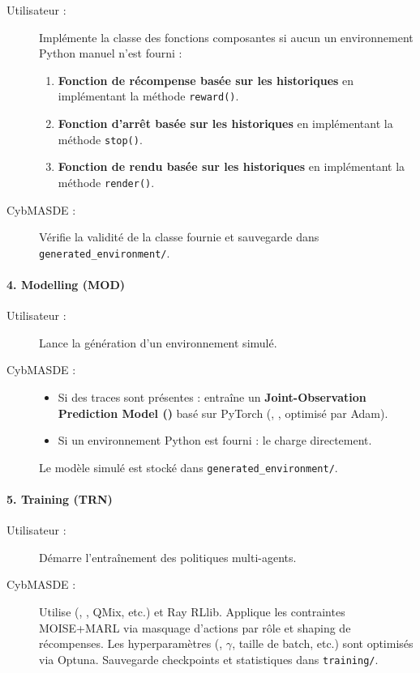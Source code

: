 \begin{description}
  \item[Utilisateur :] Implémente la classe des fonctions composantes si aucun un environnement Python manuel n’est fourni :
    \begin{enumerate}
      \item \textbf{Fonction de récompense basée sur les historiques} en implémentant la méthode \texttt{reward()}.
      \item \textbf{Fonction d'arrêt basée sur les historiques} en implémentant la méthode \texttt{stop()}.
      \item \textbf{Fonction de rendu basée sur les historiques} en implémentant la méthode \texttt{render()}.
    \end{enumerate}
  \item[CybMASDE :] Vérifie la validité de la classe fournie et sauvegarde dans \texttt{generated\_environment/}.
\end{description}

\paragraph{4. Modelling (MOD)}
\begin{description}
  \item[Utilisateur :] Lance la génération d’un environnement simulé.
  \item[CybMASDE :]
    \begin{itemize}
      \item Si des traces sont présentes : entraîne un \textbf{Joint-Observation Prediction Model ()} basé sur PyTorch (, ,  optimisé par Adam).
      \item Si un environnement Python est fourni : le charge directement.
    \end{itemize}
    Le modèle simulé est stocké dans \texttt{generated\_environment/}.
\end{description}

\paragraph{5. Training (TRN)}
\begin{description}
  \item[Utilisateur :] Démarre l’entraînement des politiques multi-agents.
  \item[CybMASDE :] Utilise  (, , QMix, etc.) et Ray RLlib. Applique les contraintes MOISE+MARL via masquage d’actions par rôle et shaping de récompenses. Les hyperparamètres (, $\gamma$, taille de batch, etc.) sont optimisés via Optuna. Sauvegarde checkpoints et statistiques dans \texttt{training/}.
\end{description}

